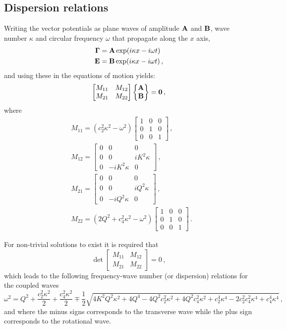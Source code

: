 \documentclass[12pt]{article}
\begin{document}
\subsection{Dispersion relations}
Writing the vector potentials as plane waves of amplitude $ \vb{A}$ and $ \vb{B}$, wave number $\kappa$ and circular frequency $\omega$ that propagate along the \(x\) axis, 
\begin{align*}
\vb{\Gamma} &= \vb{A}\exp(i\kappa x - i\omega t)\\
\vb{E} &= \vb{B}\exp(i\kappa x - i\omega t)\, ,
\end{align*}
and using these in the equations of motion yields:
\[\begin{bmatrix}
M_{11} &M_{12}\\
M_{21} &M_{22}\end{bmatrix}
\begin{Bmatrix} \vb{A}\\ \vb{B}\end{Bmatrix}
= \vb{0}\, ,\]
where
\begin{align*}
&M_{11} =
(c_{2}^{2} \kappa^{2} - \omega^{2})
\begin{bmatrix}
1 & 0 & 0\\
0 & 1 & 0 \\
0 & 0 & 1
\end{bmatrix}\, ,\\
&M_{12} =
\begin{bmatrix}
0 & 0 & 0\\
0 & 0 & i K^{2} \kappa\\
0 & -i K^{2} \kappa & 0
\end{bmatrix}\, ,\\
&M_{21} =
\begin{bmatrix}
0 & 0 & 0 \\
0 & 0 & i Q^{2} \kappa \\
0 & -i Q^{2} \kappa & 0 
\end{bmatrix}\, ,\\
&M_{22} =
(2 Q^{2} + c_{4}^{2} \kappa^{2} - \omega^{2})\begin{bmatrix}
1 &0 &0\\
0 &1 &0\\
0 &0 &1
\end{bmatrix}\, .
\end{align*}

For non-trivial solutions to exist it is required that
\[\det\begin{bmatrix}
M_{11} &M_{12}\\
M_{21} &M_{22}\end{bmatrix}=0\, ,\]
which leads to the following frequency-wave number (or dispersion) relations for the coupled waves
\begin{equation*}
\omega^2 = Q^{2} + \frac{c_{2}^{2} \kappa^{2}}{2} + \frac{c_{4}^{2} \kappa^{2}}{2} \mp \frac{1}{2} \sqrt{4 K^{2} Q^{2} \kappa^{2} + 4 Q^{4} - 4 Q^{2} c_{2}^{2} \kappa^{2} + 4 Q^{2} c_{4}^{2} \kappa^{2} + c_{2}^{4} \kappa^{4} - 2 c_{2}^{2} c_{4}^{2} \kappa^{4} + c_{4}^{4} \kappa^{4}}\, ,
\end{equation*}
and where the minus signs corresponds to the transverse wave while the plus sign corresponds to the rotational wave.
\end{document}
